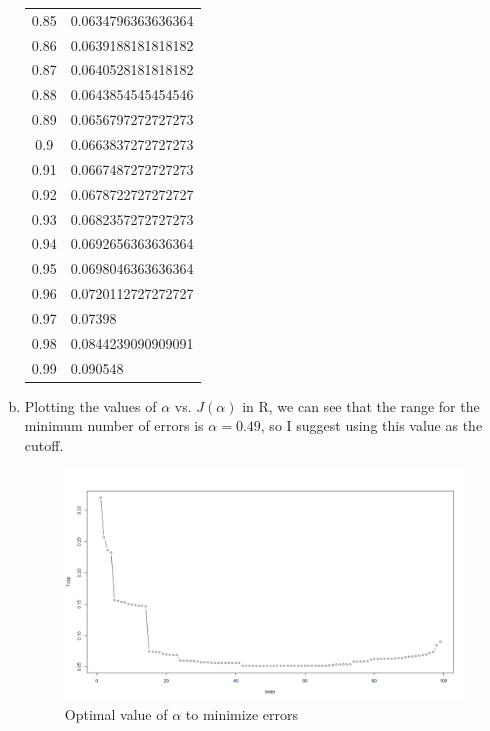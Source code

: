 \documentclass[11pt]{extarticle}
\begin{document}
\begin{enumerate}[(a)]
\begin{table}[ht!]
\begin{minipage}{0.4\textwidth}
\begin{tabular}{cl}
0.85 & 0.0634796363636364 \\
0.86 & 0.0639188181818182 \\
0.87 & 0.0640528181818182 \\
0.88 & 0.0643854545454546 \\
0.89 & 0.0656797272727273 \\
0.9 & 0.0663837272727273 \\
0.91 & 0.0667487272727273 \\
0.92 & 0.0678722727272727 \\
0.93 & 0.0682357272727273 \\
0.94 & 0.0692656363636364 \\
0.95 & 0.0698046363636364 \\
0.96 & 0.0720112727272727 \\
0.97 & 0.07398 \\
0.98 & 0.0844239090909091 \\
0.99 & 0.090548 \\
\toprule
\end{tabular}

\end{minipage}
\end{table}


\item  Plotting the values of $\alpha$ vs. $J(\alpha)$ in R, we can see that the range for the minimum number of errors is $\alpha = 0.49$, so I suggest using this value as the cutoff. 

\begin{figure}[H]
\centering \includegraphics[width=150mm]{alpha.png}
\caption{Optimal value of $\alpha$ to minimize errors}
\end{figure}

\end{enumerate}
\end{document}
